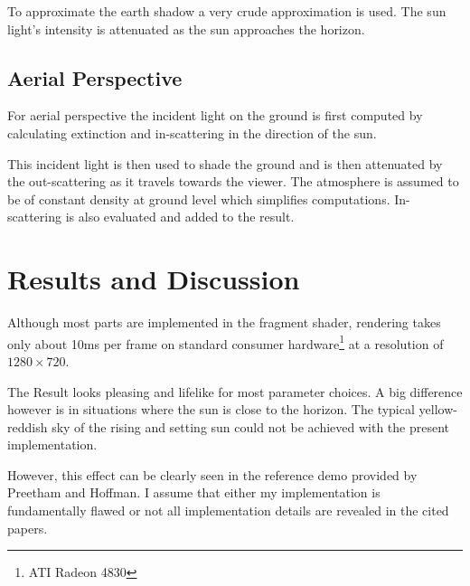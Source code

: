 \documentclass[12pt,a4paper]{scrartcl}
\begin{document}
To approximate the earth shadow a very crude approximation is used. The sun light's intensity is attenuated as the sun approaches the horizon. 



\subsection{Aerial Perspective}
For aerial perspective the incident light on the ground is first computed by calculating extinction and in-scattering in the direction of the sun. 

This incident light is then used to shade the ground and is then attenuated by the out-scattering as it travels towards the viewer. The atmosphere is assumed to be of constant density at ground level which simplifies computations. In-scattering is also evaluated and added to the result.



\section{Results and Discussion}
Although most parts are implemented in the fragment shader, rendering takes only about 10ms per frame on standard consumer hardware\footnote{ATI Radeon 4830} at a resolution of $1280 \times 720$. 

The Result looks pleasing and lifelike for most parameter choices. A big difference however is in situations where the sun is close to the horizon. The typical yellow-reddish sky of the rising and setting sun could not be achieved with the present implementation. 

However, this effect can be clearly seen in the reference demo provided by Preetham and Hoffman. I assume that either my implementation is fundamentally flawed or not all implementation details are revealed in the cited papers.

\begin{figure}[hbtp]
\centering
{}

\end{figure}
\end{document}
